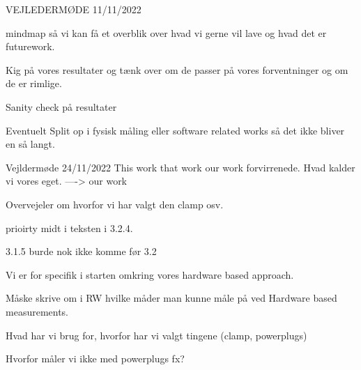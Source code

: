

VEJLEDERMØDE 11/11/2022

mindmap så vi kan få et overblik over hvad vi gerne vil lave og hvad det er futurework.

Kig på vores resultater og tænk over om de passer på vores forventninger og om de er rimlige. 

Sanity check på resultater

Eventuelt Split op i fysisk måling eller software related works så det ikke bliver en så langt.

Vejldermøde 24/11/2022
This work that work our work forvirrenede. Hvad kalder vi vores eget.
----> our work

Overvejeler om hvorfor vi har valgt den clamp osv.

prioirty midt i teksten i 3.2.4.

3.1.5 burde nok ikke komme før 3.2

Vi er for specifik i starten omkring vores hardware based approach.

Måske skrive om i RW hvilke måder man kunne måle på ved Hardware based measurements.

Hvad har vi brug for, hvorfor har vi valgt tingene (clamp, powerplugs)

Hvorfor måler vi ikke med powerplugs fx?

